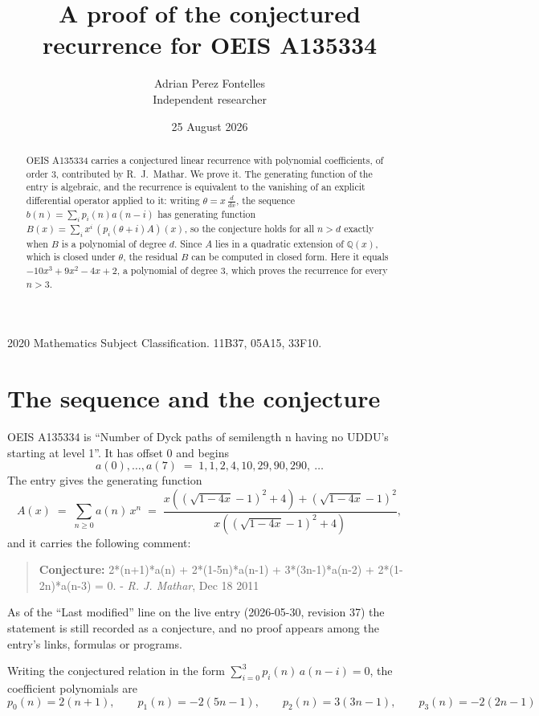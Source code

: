 \documentclass[11pt,a4paper]{article}
\title{A proof of the conjectured recurrence for OEIS A135334}
\author{Adrian Perez Fontelles\\ \small Independent researcher}
\date{25 August 2026}
\theoremstyle{plain}
\theoremstyle{definition}
\begin{document}
\maketitle

\begin{abstract}
OEIS A135334 carries a conjectured linear recurrence with polynomial coefficients, of
order 3, contributed by R.~J.~Mathar. We prove it. The generating function of the
entry is algebraic, and the recurrence is equivalent to the vanishing of an explicit
differential operator applied to it: writing $\theta=x\,\frac{d}{dx}$, the sequence
$b(n)=\sum_{i}p_{i}(n)a(n-i)$ has generating function
$B(x)=\sum_{i}x^{i}\,(p_{i}(\theta+i)A)(x)$, so the conjecture holds for all $n>d$ exactly
when $B$ is a polynomial of degree $d$. Since $A$ lies in a quadratic extension of
$\mathbb{Q}(x)$, which is closed under $\theta$, the residual $B$ can be computed in
closed form. Here it equals $- 10 x^{3} + 9 x^{2} - 4 x + 2$, a polynomial of degree $3$, which proves
the recurrence for every $n>3$.
\end{abstract}

\noindent\small 2020 Mathematics Subject Classification. 11B37, 05A15, 33F10.\normalsize

\section{The sequence and the conjecture}

OEIS A135334 is ``Number of Dyck paths of semilength n having no UDDU's starting at level 1''. It has offset $0$ and begins
\[
a(0),\dots,a(7)\;=\;1, 1, 2, 4, 10, 29, 90, 290,\ \dots
\]
The entry gives the generating function
\begin{equation}\label{eq:gf}
A(x)\;=\;\sum_{n\ge 0} a(n)\,x^{n}\;=\;\frac{x \left(\left(\sqrt{1 - 4 x} - 1\right)^{2} + 4\right) + \left(\sqrt{1 - 4 x} - 1\right)^{2}}{x \left(\left(\sqrt{1 - 4 x} - 1\right)^{2} + 4\right)} ,
\end{equation}
and it carries the following comment:
\begin{quote}\small
\textbf{Conjecture:} 2*(n+1)*a(n) + 2*(1-5n)*a(n-1) + 3*(3n-1)*a(n-2) + 2*(1-2n)*a(n-3) = 0. - \emph{R. J. Mathar}, Dec 18 2011
\end{quote}
As of the ``Last modified'' line on the live entry (2026-05-30, revision 37) the
statement is still recorded as a conjecture, and no proof appears among the entry's links,
formulas or programs.

Writing the conjectured relation in the form $\sum_{i=0}^{3}p_{i}(n)\,a(n-i)=0$,
the coefficient polynomials are
\[
p_{0}(n)=2 \left(n + 1\right),\qquad p_{1}(n)=- 2 \left(5 n - 1\right),\qquad p_{2}(n)=3 \left(3 n - 1\right),\qquad p_{3}(n)=- 2 \left(2 n - 1\right)
\]
\end{document}
